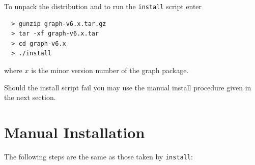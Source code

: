\documentclass[11pt]{article}
\begin{document}
To unpack the distribution and to run the \verb|install|
script enter

\begin{verbatim}
  > gunzip graph-v6.x.tar.gz
  > tar -xf graph-v6.x.tar
  > cd graph-v6.x
  > ./install
\end{verbatim}

\noindent where $x$ is the minor version number of the graph package.

Should the install script fail you may use the manual install
procedure given in the next section.

\section{Manual Installation}

The following steps are the same as those taken by \verb|install|:
\end{document}
